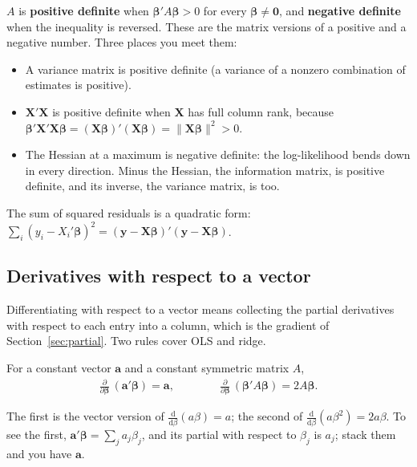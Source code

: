 \documentclass[11pt]{article}
\theoremstyle{definition}
\newcommand{\X}{\bm{X}}
\newcommand{\Y}{\bm{y}}
\newcommand{\bbeta}{\bm{\beta}}
\newcommand{\dd}{\mathrm{d}}
\begin{document}
$A$ is \textbf{positive definite} when $\bbeta'A\bbeta > 0$ for every
$\bbeta \ne \bm 0$, and \textbf{negative definite} when the inequality is
reversed. These are the matrix versions of a positive and a negative number.
Three places you meet them:
\begin{itemize}
  \item A variance matrix is positive definite (a variance of a nonzero
        combination of estimates is positive).
  \item $\X'\X$ is positive definite when $\X$ has full column rank,
        because $\bbeta'\X'\X\bbeta = (\X\bbeta)'(\X\bbeta) = \|\X\bbeta\|^2
        > 0$.
  \item The Hessian at a maximum is negative definite: the log-likelihood
        bends down in every direction. Minus the Hessian, the information
        matrix, is positive definite, and its inverse, the variance matrix,
        is too.
\end{itemize}
The sum of squared residuals is a quadratic form:
$\sum_i (y_i - X_i'\bbeta)^2 = (\Y - \X\bbeta)'(\Y - \X\bbeta)$.

\subsection{Derivatives with respect to a vector}
\label{sec:matcalc}

Differentiating with respect to a vector means collecting the partial
derivatives with respect to each entry into a column, which is the gradient
of Section~\ref{sec:partial}. Two rules cover OLS and ridge.

\begin{rulebox}
For a constant vector $\bm a$ and a constant symmetric matrix $A$,
\begin{align*}
  \frac{\partial}{\partial\bbeta}\,(\bm a'\bbeta) = \bm a,
  \qquad\qquad
  \frac{\partial}{\partial\bbeta}\,(\bbeta'A\bbeta) = 2A\bbeta .
\end{align*}
\end{rulebox}
The first is the vector version of $\frac{\dd}{\dd\beta}(a\beta) = a$; the
second of $\frac{\dd}{\dd\beta}(a\beta^2) = 2a\beta$. To see the first,
$\bm a'\bbeta = \sum_j a_j\beta_j$, and its partial with respect to
$\beta_j$ is $a_j$; stack them and you have $\bm a$.
\end{document}
